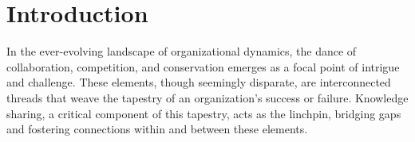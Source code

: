 \documentclass[sn-nature]{sn-jnl}%
\theoremstyle{thmstyleone}%
\theoremstyle{thmstyletwo}%
\theoremstyle{thmstylethree}%
\begin{document}
% 
% 
% 




\clearpage
\tableofcontents
\listoftables
\listoffigures
\clearpage

\section{Introduction}\label{sec1}

In the ever-evolving landscape of organizational dynamics, the dance of collaboration, competition, and conservation emerges as a focal point of intrigue and challenge. These elements, though seemingly disparate, are interconnected threads that weave the tapestry of an organization's success or failure. Knowledge sharing, a critical component of this tapestry, acts as the linchpin, bridging gaps and fostering connections within and between these elements.
\end{document}
